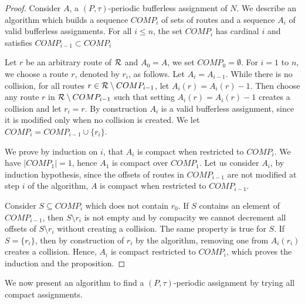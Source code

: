 \documentclass[a4paper,10pt]{journal}
\begin{document}
\begin{proof}
Consider $A$, a $(P,\tau)$-periodic bufferless assignment of $N$.
We describe an algorithm which builds a sequence $COMP_i$ of sets of routes and a sequence  
$A_i$ of valid bufferless assignments. For all $i \leq n$, the set $COMP_i$ has cardinal $i$ and satisfies  $COMP_{i-1} \subset COMP_i$

Let $r$ be an arbitrary route of ${\cal R}$ and $A_0 = A$, we set $COMP_0 = \emptyset$.
 For $i = 1$ to $n$, we choose a route $r$, denoted by $r_i$, as follows.
Let $A_{i} = A_{i-1}$. While there is no collision, for all routes $r \in {\cal R} \setminus COMP_{i-1}$, let $A_i(r) = A_i(r) - 1$. Then choose any route $r$ in ${\cal R} \setminus COMP_{i-1}$ such that setting $A_i(r) = A_i(r)-1$ creates a collision and let $r_i = r$. By construction $A_i$ is a valid bufferless assignment, since it is modified only when no collision is created. We let $COMP_i = COMP_{i-1} \cup \{r_i\}$.

We prove by induction on $i$, that $A_i$ is compact when restricted to $COMP_{i}$.
We have $|COMP_1| = 1$, hence $A_1$ is compact over $COMP_1$. Let us consider $A_i$,
by induction hypothesis, since the offsets of routes in $COMP_{i-1}$ are not modified at step $i$ of the algorithm, $A$ is compact when restricted to $COMP_{i-1}$. 

 Consider $S \subseteq COMP_i$ which does not contain $r_0$. If $S$ contains
an element of $COMP_{i-1}$, then $S \setminus {r_i}$ is not empty and by compacity we cannot decrement all offsets of $S\setminus {r_i}$ without creating a collision. The same property is true for $S$. If $S = \{r_i\}$, then by construction of $r_i$ by the algorithm, removing one from $A_i(r_i)$ creates a collision. Hence, $A_i$ is compact restricted to $COMP_{i}$, which proves the induction and the proposition.
\end{proof}

We now present an algorithm to find a $(P,\tau)$-periodic assignment by trying all compact assignments.
\end{document}
